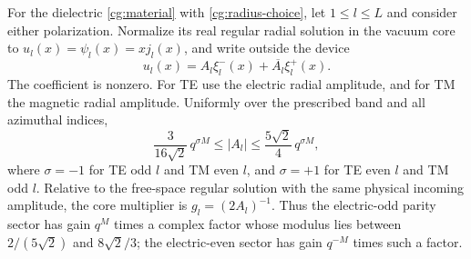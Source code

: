 \begin{theorem}
\label{cg:simultaneous-gain}
For the dielectric \eqref{cg:material} with
\eqref{cg:radius-choice}, let $1\leq l\leq L$ and consider either
polarization.  Normalize its real regular radial solution in the
vacuum core to $u_l(x)=\psi_l(x)=xj_l(x)$, and write outside the
device
\begin{equation}\label{cg:outside-coefficient}
 u_l(x)=A_l\xi_l^-(x)+\overline{A_l}\xi_l^+(x).
\end{equation}
The coefficient is nonzero.  For TE use the electric radial
amplitude, and for TM the magnetic radial amplitude.  Uniformly
over the prescribed band and all azimuthal indices,
\begin{equation}\label{cg:amplitude-bounds}
 \frac{3}{16\sqrt2}\,q^{\sigma M}
   \leq |A_l|\leq\frac{5\sqrt2}{4}\,q^{\sigma M},
\end{equation}
where $\sigma=-1$ for TE odd $l$ and TM even $l$, and
$\sigma=+1$ for TE even $l$ and TM odd $l$.
Relative to the free-space regular solution with the same physical
incoming amplitude, the core multiplier is $g_l=(2A_l)^{-1}$.
Thus the electric-odd parity sector has gain $q^M$ times a complex
factor whose modulus lies between $2/(5\sqrt2)$ and $8\sqrt2/3$;
the electric-even sector has gain $q^{-M}$ times such a factor.
\end{theorem}
